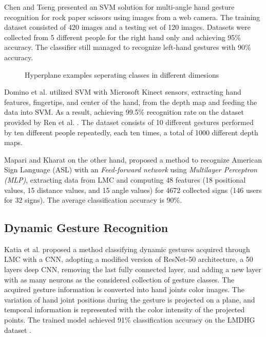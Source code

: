 Chen and Tseng \cite{chentseng} presented an SVM solution for multi-angle hand gesture recognition for rock paper scissors using images from a web camera. The training dataset consisted of 420 images and a testing set of 120 images. 
Datasets were collected from 5 different people for the right hand only and achieving 95\% accuracy. The classifier still managed to recognize left-hand gestures with 90\% accuracy. 

\begin{figure}[H]
    \centering
    \qquad
    \caption{Hyperplane examples seperating classes in different dimesions \cite{svm_pic}}
\end{figure}


Domino et al. \cite{dominokinect} utilized SVM with Microsoft Kinect sensors, extracting hand features, fingertips, and center of the hand, from the depth map and feeding the data into SVM. As a result, achieving 99.5\% recognition rate on the dataset provided by Ren et al. \cite{dominokinect_data}. The dataset consists of 10 different gestures performed by ten different people repeatedly, each ten times, a total of 1000 different depth maps.

Mapari and Kharat \cite{mapari} on the other hand, proposed a method to recognize American Sign Language (ASL) with an \textit{Feed-forward network} using \textit{Multilayer Perceptron (MLP)}, extracting data from LMC and computing 48 features (18 positional values, 15 distance values, and 15 angle values) for 4672 collected signs (146 users for 32 signs). The average classification accuracy is 90\%.

\subsection{Dynamic Gesture Recognition}

Katia et al. \cite{katiacnn} proposed a method classifying dynamic gestures acquired through LMC with a CNN, adopting a modified version of ResNet-50 architecture, a 50 layers deep CNN, removing the last fully connected layer, and adding a new layer with as many neurons as the considered collection of gesture classes. 
The acquired gesture information is converted into hand joints color images. The variation of hand joint positions during the gesture is projected on a plane, and temporal information is represented with the color intensity of the projected points. The trained model achieved 91\% classification accuracy on the LMDHG dataset \cite{lmdhg}.

